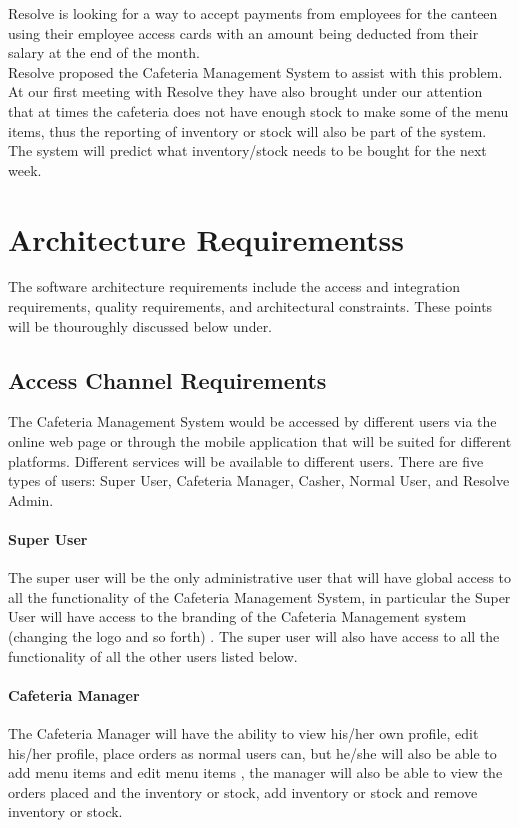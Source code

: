 \documentclass[12pt]{article}
\begin{document}
Resolve is looking for a way to accept payments from employees for the canteen
using their employee access cards with an amount being deducted from their salary at the end of the month.\\

Resolve proposed the Cafeteria Management System to assist with this problem.
At our first meeting with Resolve they have also brought under our attention that at times the cafeteria does not have enough stock to make some of the menu items, thus the reporting of inventory or stock will also be part of the system. The system will predict what inventory/stock needs to be bought for the next week.

\section{Architecture Requirementss}
The software architecture requirements include the access and integration requirements, quality
requirements, and architectural constraints. These points will be thouroughly discussed below under.

\subsection{Access Channel Requirements}
The Cafeteria Management System would be accessed by different users via  the online web page or through the mobile application that will be suited for different platforms. Different services will be available to different users. There are five types of users: Super User, Cafeteria Manager, Casher, Normal User, and Resolve Admin. \\

\paragraph{Super User\\}
The super user will be the only administrative user that will have global access to all the functionality of the Cafeteria Management System, in particular the Super User will have access to the branding of the Cafeteria Management system (changing the logo and so forth) . The super user will also have access to all the functionality of all the other users listed below.

\paragraph{ Cafeteria Manager\\}
The Cafeteria Manager will have the ability to view his/her own profile, edit his/her profile, place orders as normal users can, but he/she will also be able to add menu items and edit menu items , the manager will also be able to view the orders placed and the inventory or stock, add inventory or stock and remove inventory or stock.
\end{document}
